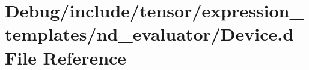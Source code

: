 \hypertarget{Debug_2include_2tensor_2expression__templates_2nd__evaluator_2Device_8d}{}\section{Debug/include/tensor/expression\+\_\+templates/nd\+\_\+evaluator/\+Device.d File Reference}
\label{Debug_2include_2tensor_2expression__templates_2nd__evaluator_2Device_8d}
